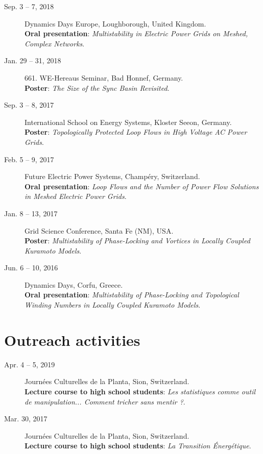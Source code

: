 \documentclass[10pt]{article}
\begin{document}
\begin{description}
 \item [Sep. 3 -- 7, 2018] Dynamics Days Europe, Loughborough, United Kingdom. \\
 \textcolor{hei}{\bf Oral presentation}: \textit{Multistability in Electric Power Grids on Meshed, Complex Networks}.
 
 \item [Jan. 29 -- 31, 2018] 661. WE-Hereaus Seminar, Bad Honnef, Germany. \\
 \textcolor{hei}{\bf Poster}: \textit{The Size of the Sync Basin Revisited}.
 
 \item [Sep. 3 -- 8, 2017] International School on Energy Systems, Kloster Seeon, Germany. \\ 
 \textcolor{hei}{\bf Poster}: \textit{Topologically Protected Loop Flows in High Voltage AC Power Grids}.
 
 \item [Feb. 5 -- 9, 2017] Future Electric Power Systems, Champ\'ery, Switzerland. \\ 
 \textcolor{hei}{\bf Oral presentation}: \textit{Loop Flows and the Number of Power Flow Solutions in Meshed Electric Power Grids}.
 
 \item [Jan. 8 -- 13, 2017] Grid Science Conference, Santa Fe (NM), USA. \\ 
 \textcolor{hei}{\bf Poster}: \textit{Multistability of Phase-Locking and Vortices in Locally Coupled Kuramoto Models}. 
 
 \item [Jun. 6 -- 10, 2016] Dynamics Days, Corfu, Greece. \\ 
 \textcolor{hei}{\bf Oral presentation}: \textit{Multistability of Phase-Locking and Topological Winding Numbers in Locally Coupled Kuramoto Models}. 
\end{description}

\section*{Outreach activities}
 \begin{description}
  \item [Apr. 4 -- 5, 2019] Journ\'ees Culturelles de la Planta, Sion, Switzerland. \\
  \textcolor{hei}{\bf Lecture course to high school students}: \textit{Les statistiques comme outil de manipulation... Comment tricher sans mentir ?}.
  
  \item [Mar. 30, 2017] Journ\'ees Culturelles de la Planta, Sion, Switzerland. \\
  \textcolor{hei}{\bf Lecture course to high school students}: \textit{La Transition \'Energ\'etique}.
 \end{description}
\end{document}
